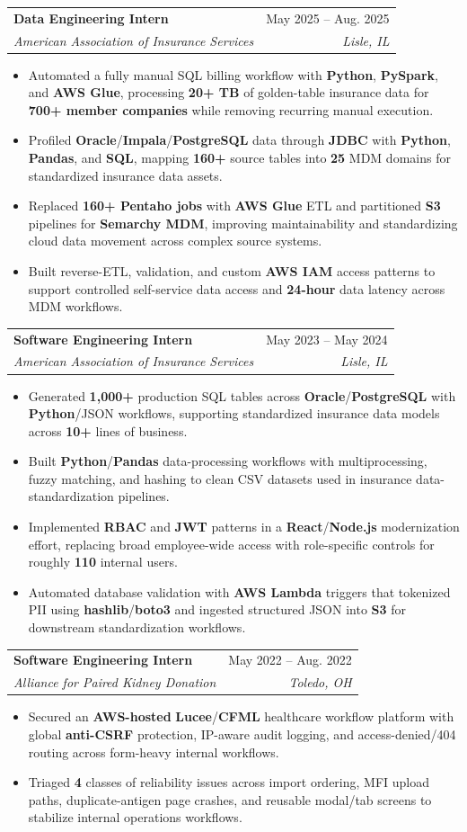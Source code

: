 \documentclass[letterpaper,11pt]{article}
\makeatletter
\newcommand{\resumeItem}[1]{
  \item\small{
    {#1 \vspace{-1pt}}
  }
}
\newcommand{\resumeSubheading}[4]{
  \vspace{-1pt}\item
    \begin{tabular*}{0.97\textwidth}[t]{l@{\extracolsep{\fill}}r}
      \textbf{#1} & #2 \\
      \textit{\small#3} & \textit{\small #4} \\
    \end{tabular*}\vspace{-3pt}
}
\newcommand{\resumeItemListStart}{\begin{itemize}[leftmargin=0.16in, itemsep=0pt, topsep=0pt, parsep=0pt]}
\newcommand{\resumeItemListEnd}{\end{itemize}\vspace{-4pt}}
\makeatother
\begin{document}
    \resumeSubheading
      {Data Engineering Intern}{May 2025 -- Aug. 2025}
      {American Association of Insurance Services}{Lisle, IL}
      \resumeItemListStart
        \resumeItem{Automated a fully manual SQL billing workflow with \textbf{Python}, \textbf{PySpark}, and \textbf{AWS Glue}, processing \textbf{20+ TB} of golden-table insurance data for \textbf{700+ member companies} while removing recurring manual execution.}
        \resumeItem{Profiled \textbf{Oracle}/\textbf{Impala}/\textbf{PostgreSQL} data through \textbf{JDBC} with \textbf{Python}, \textbf{Pandas}, and \textbf{SQL}, mapping \textbf{160+} source tables into \textbf{25} MDM domains for standardized insurance data assets.}
        \resumeItem{Replaced \textbf{160+ Pentaho jobs} with \textbf{AWS Glue} ETL and partitioned \textbf{S3} pipelines for \textbf{Semarchy MDM}, improving maintainability and standardizing cloud data movement across complex source systems.}
        \resumeItem{Built reverse-ETL, validation, and custom \textbf{AWS IAM} access patterns to support controlled self-service data access and \textbf{24-hour} data latency across MDM workflows.}
      \resumeItemListEnd

    \resumeSubheading
      {Software Engineering Intern}{May 2023 -- May 2024}
      {American Association of Insurance Services}{Lisle, IL}
      \resumeItemListStart
        \resumeItem{Generated \textbf{1,000+} production SQL tables across \textbf{Oracle}/\textbf{PostgreSQL} with \textbf{Python}/JSON workflows, supporting standardized insurance data models across \textbf{10+} lines of business.}
        \resumeItem{Built \textbf{Python}/\textbf{Pandas} data-processing workflows with multiprocessing, fuzzy matching, and hashing to clean CSV datasets used in insurance data-standardization pipelines.}
        \resumeItem{Implemented \textbf{RBAC} and \textbf{JWT} patterns in a \textbf{React}/\textbf{Node.js} modernization effort, replacing broad employee-wide access with role-specific controls for roughly \textbf{110} internal users.}
        \resumeItem{Automated database validation with \textbf{AWS Lambda} triggers that tokenized PII using \textbf{hashlib}/\textbf{boto3} and ingested structured JSON into \textbf{S3} for downstream standardization workflows.}
      \resumeItemListEnd

    \resumeSubheading
      {Software Engineering Intern}{May 2022 -- Aug. 2022}
      {Alliance for Paired Kidney Donation}{Toledo, OH}
      \resumeItemListStart
        \resumeItem{Secured an \textbf{AWS-hosted} \textbf{Lucee}/\textbf{CFML} healthcare workflow platform with global \textbf{anti-CSRF} protection, IP-aware audit logging, and access-denied/404 routing across form-heavy internal workflows.}
        \resumeItem{Triaged \textbf{4} classes of reliability issues across import ordering, MFI upload paths, duplicate-antigen page crashes, and reusable modal/tab screens to stabilize internal operations workflows.}
      \resumeItemListEnd
\end{document}
